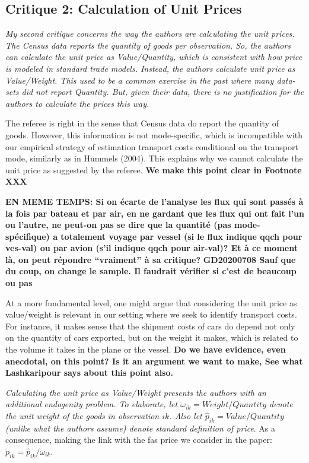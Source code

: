 \documentclass[a4paper,12pt]{article}
\begin{document}
\subsection{Critique 2: Calculation of Unit Prices}

\textit{My second critique concerns the way the authors are calculating the unit prices.
The Census data reports the quantity of goods per observation. So, the authors
can calculate the unit price as Value/Quantity, which is consistent with how
price is modeled in standard trade models. Instead, the authors calculate unit
price as Value/Weight. This used to be a common exercise in the past where
many data-sets did not report Quantity. But, given their data, there is no
justification for the authors to calculate the prices this way.}

The referee is right in the sense that Census data do report the quantity of goods. However, this information is not mode-specific, which is incompatible with our empirical strategy of estimation transport costs conditional on the transport mode, similarly as in Hummels (2004). This explains why we cannot calculate the unit price as suggested by the referee. \textbf{We make this point clear in Footnote XXX}

\textbf{EN MEME TEMPS: Si on écarte de l'analyse les flux qui sont passés à la fois par bateau et par air, en ne gardant que les flux qui ont fait l'un ou l'autre, ne peut-on pas se dire que la quantité (pas mode-spécifique) a totalement voyage par vessel (si le flux indique qqch pour ves-val) ou par avion (s'il indique qqch pour air-val)? Et à ce moment là, on peut répondre ``vraiment'' à sa critique?} \textbf{GD20200708 Sauf que du coup, on change le sample. Il faudrait vérifier si c’est de beaucoup ou pas}

At a more fundamental level, one might argue that considering the unit price as value/weight is relevant in our setting where we seek to identify transport costs. For instance, it makes sense that the shipment costs of cars do depend not only on the quantity of cars exported, but on the weight it makes, which is related to the volume it takes in the plane or the vessel. \textbf{Do we have evidence, even anecdotal, on this point? Is it an argument we want to make, See what Lashkaripour says about this point also.}

\textit{Calculating the unit price as Value/Weight presents the authors
with an additional endogenity problem. To elaborate, let $\omega_{ik} = Weight/Quantity$
denote the unit weight of the goods in observation $ik$. Also let $\widehat{p}_{ik} = Value/Quantity$
(unlike what the authors assume) denote standard definition of price}. As a consequence, making the link with the fas price we consider in the paper: $\widetilde{p}_{ik} = \widehat{p}_{ik} / \omega_{ik}$.
\end{document}
